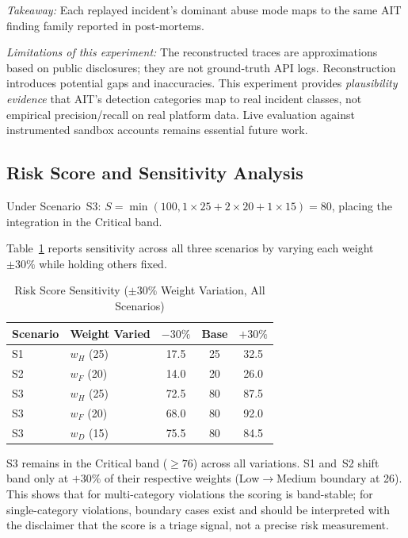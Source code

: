 \documentclass[conference]{IEEEtran}
\begin{document}
\noindent\textit{Takeaway:} Each replayed incident's dominant abuse mode
maps to the same AIT finding family reported in post-mortems.

\noindent\textit{Limitations of this experiment:} The reconstructed
traces are approximations based on public disclosures; they are not
ground-truth API logs. Reconstruction introduces potential gaps and
inaccuracies. This experiment provides \emph{plausibility evidence}
that AIT's detection categories map to real incident classes, not
empirical precision/recall on real platform data. Live evaluation
against instrumented sandbox accounts remains essential future work.

\subsection{Risk Score and Sensitivity Analysis}

Under Scenario~S3:
$S = \min(100, 1{\times}25 + 2{\times}20 + 1{\times}15) = 80$,
placing the integration in the Critical band.

Table~\ref{tab:sensitivity} reports sensitivity across all three
scenarios by varying each weight $\pm30\%$ while holding others
fixed.

\begin{table}[htbp]
  \caption{Risk Score Sensitivity ($\pm30\%$ Weight Variation, All Scenarios)}
  \label{tab:sensitivity}
  \centering
  \renewcommand{\arraystretch}{1.25}
  \begin{tabular}{llccc}
    \toprule
    \textbf{Scenario} & \textbf{Weight Varied} & \textbf{$-30\%$} & \textbf{Base} & \textbf{$+30\%$} \\
    \midrule
    S1 & $w_H$ (25) & 17.5 & 25  & 32.5 \\
    S2 & $w_F$ (20) & 14.0 & 20  & 26.0 \\
    S3 & $w_H$ (25) & 72.5 & 80  & 87.5 \\
    S3 & $w_F$ (20) & 68.0 & 80  & 92.0 \\
    S3 & $w_D$ (15) & 75.5 & 80  & 84.5 \\
    \bottomrule
  \end{tabular}
\end{table}

S3 remains in the Critical band ($\geq76$) across all variations.
S1 and~S2 shift band only at $+30\%$ of their respective weights
(Low$\to$Medium boundary at 26). This shows that for multi-category
violations the scoring is band-stable; for single-category violations,
boundary cases exist and should be interpreted with the disclaimer
that the score is a triage signal, not a precise risk measurement.
\end{document}
